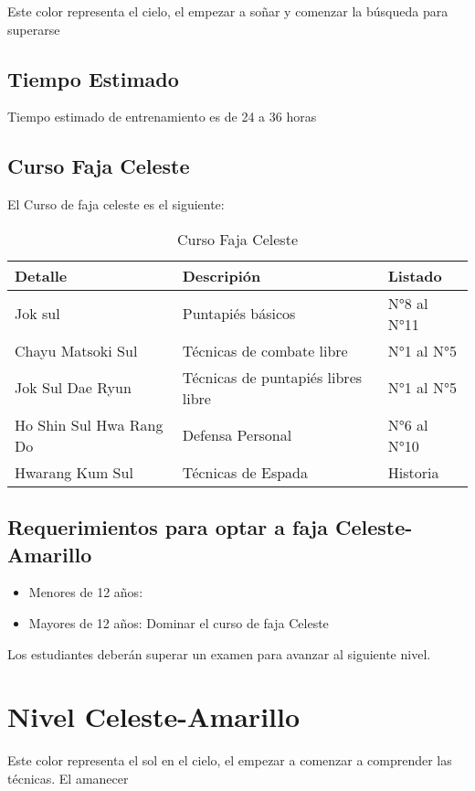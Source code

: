 Este color representa el cielo, el empezar a soñar y comenzar la búsqueda para superarse

\subsection[Duración]{Tiempo Estimado}

Tiempo estimado de entrenamiento es de 24 a 36 horas

\subsection{Curso Faja Celeste}
El Curso de faja celeste es el siguiente:

\begin{table}[t]
	\caption{Curso Faja Celeste}
	\begin{center}
		\begin{tabular}{ | m{2cm} | m{5cm} | m{5cm} | }
			\hline Detalle & Descripión & Listado\\ \hline
			Jok sul & Puntapiés básicos & N°8 al N°11\\
			Chayu Matsoki Sul & Técnicas de combate libre & N°1 al N°5\\
			Jok Sul Dae Ryun & Técnicas de puntapiés libres libre & N°1 al N°5\\
			Ho Shin Sul Hwa Rang Do\textregistered & Defensa Personal & N°6 al N°10\\
			Hwarang Kum Sul\textregistered & Técnicas de Espada & Historia\\\hline
		\end{tabular}
	\end{center}
\end{table}

\subsection{Requerimientos para optar a faja Celeste-Amarillo}

\begin{itemize}
	\item Menores de 12 años:
	\item Mayores de 12 años: Dominar el curso de faja Celeste
\end{itemize}

Los estudiantes deberán superar un examen para avanzar al siguiente nivel.

\section{Nivel Celeste-Amarillo}
Este color representa el sol en el cielo, el empezar a comenzar a comprender las técnicas. El amanecer

